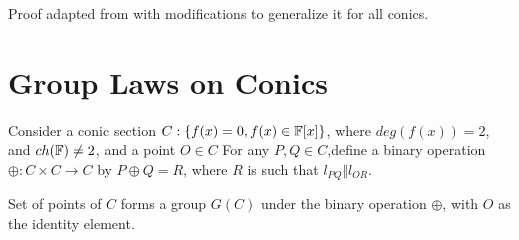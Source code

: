 Proof adapted from \cite{brannan} with modifications to generalize it for all conics.

\section{Group Laws on Conics}

Consider a conic section $C: \{f(x)=0, f(x)\in \mathbb{F}[x]\}$, where $deg(f(x))=2$, and $ch(\mathbb{F})\ne 2$,
and a point $O \in C$ For any $P,Q \in C$,define a binary operation
$\oplus :C \times C \rightarrow C$ by $P \oplus Q = R$, where $R$ is such that
$l_{PQ} \Vert l_{OR}$.

\begin{theorem}
  Set of points of $C$ forms a group $G(C)$ under the binary operation $\oplus$, with $O$ as the
  identity element.
\end{theorem}

